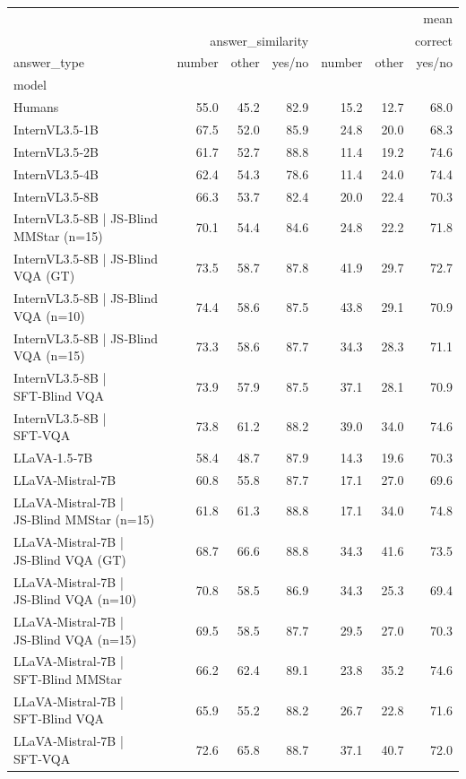 \begin{tabular}{lrrrrrr}
\toprule
 & \multicolumn{6}{r}{mean} \\
 & \multicolumn{3}{r}{answer_similarity} & \multicolumn{3}{r}{correct} \\
answer_type & number & other & yes/no & number & other & yes/no \\
model &  &  &  &  &  &  \\
\midrule
Humans & 55.0 & 45.2 & 82.9 & 15.2 & 12.7 & 68.0 \\
InternVL3.5‑1B & 67.5 & 52.0 & 85.9 & 24.8 & 20.0 & 68.3 \\
InternVL3.5‑2B & 61.7 & 52.7 & 88.8 & 11.4 & 19.2 & 74.6 \\
InternVL3.5‑4B & 62.4 & 54.3 & 78.6 & 11.4 & 24.0 & 74.4 \\
InternVL3.5‑8B & 66.3 & 53.7 & 82.4 & 20.0 & 22.4 & 70.3 \\
InternVL3.5‑8B | JS‑Blind MMStar (n=15) & 70.1 & 54.4 & 84.6 & 24.8 & 22.2 & 71.8 \\
InternVL3.5‑8B | JS‑Blind VQA (GT) & 73.5 & 58.7 & 87.8 & 41.9 & 29.7 & 72.7 \\
InternVL3.5‑8B | JS‑Blind VQA (n=10) & 74.4 & 58.6 & 87.5 & 43.8 & 29.1 & 70.9 \\
InternVL3.5‑8B | JS‑Blind VQA (n=15) & 73.3 & 58.6 & 87.7 & 34.3 & 28.3 & 71.1 \\
InternVL3.5‑8B | SFT‑Blind VQA & 73.9 & 57.9 & 87.5 & 37.1 & 28.1 & 70.9 \\
InternVL3.5‑8B | SFT‑VQA & 73.8 & 61.2 & 88.2 & 39.0 & 34.0 & 74.6 \\
LLaVA‑1.5‑7B & 58.4 & 48.7 & 87.9 & 14.3 & 19.6 & 70.3 \\
LLaVA‑Mistral‑7B & 60.8 & 55.8 & 87.7 & 17.1 & 27.0 & 69.6 \\
LLaVA‑Mistral‑7B | JS‑Blind MMStar (n=15) & 61.8 & 61.3 & 88.8 & 17.1 & 34.0 & 74.8 \\
LLaVA‑Mistral‑7B | JS‑Blind VQA (GT) & 68.7 & 66.6 & 88.8 & 34.3 & 41.6 & 73.5 \\
LLaVA‑Mistral‑7B | JS‑Blind VQA (n=10) & 70.8 & 58.5 & 86.9 & 34.3 & 25.3 & 69.4 \\
LLaVA‑Mistral‑7B | JS‑Blind VQA (n=15) & 69.5 & 58.5 & 87.7 & 29.5 & 27.0 & 70.3 \\
LLaVA‑Mistral‑7B | SFT‑Blind MMStar & 66.2 & 62.4 & 89.1 & 23.8 & 35.2 & 74.6 \\
LLaVA‑Mistral‑7B | SFT‑Blind VQA & 65.9 & 55.2 & 88.2 & 26.7 & 22.8 & 71.6 \\
LLaVA‑Mistral‑7B | SFT‑VQA & 72.6 & 65.8 & 88.7 & 37.1 & 40.7 & 72.0 \\

\end{tabular}
